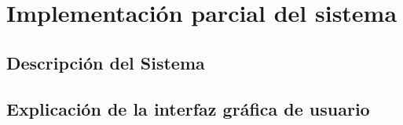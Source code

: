 \section{Implementación parcial del sistema}

\subsection{Descripción del Sistema}

\subsection{Explicación de la interfaz gráfica de usuario}
